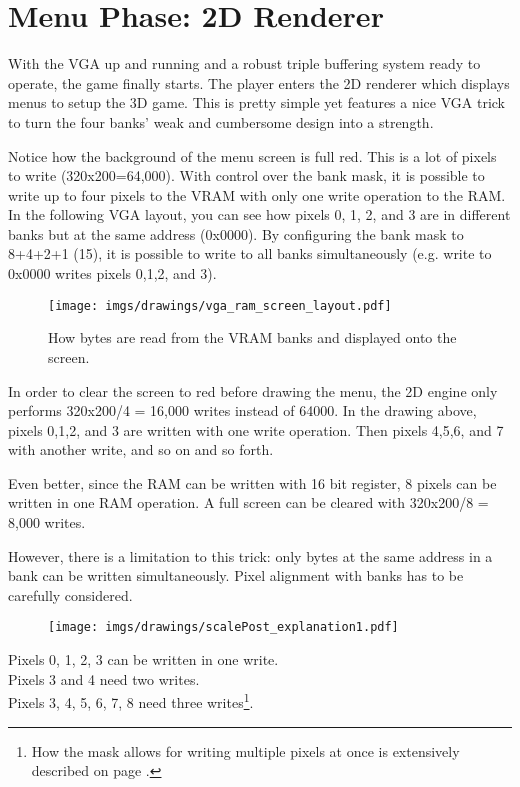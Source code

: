 \section{Menu Phase: 2D Renderer}
With the VGA up and running and a robust triple buffering system ready to operate, the game finally starts. The player enters the 2D renderer which displays menus to setup the 3D game. This is pretty simple yet features a nice VGA trick to turn the four banks' weak and cumbersome design into a strength.
\par
\begin{figure}[H]
\centering
{}
\end{figure}
\par

Notice how the background of the menu screen is full red. This is a lot of pixels to write (320x200=64,000). With control over the bank mask, it is possible to write up to four pixels to the VRAM with only one write operation to the RAM. In the following VGA layout, you can see how pixels 0, 1, 2, and 3 are in different banks but at the same address (0x0000). By configuring the bank mask to 8+4+2+1 (15), it is possible to write to all banks simultaneously (e.g. write to 0x0000 writes pixels 0,1,2, and 3).\\
\par
\begin{figure}[H]
\centering
\texttt{[image: imgs/drawings/vga\_ram\_screen\_layout.pdf]}
\caption{How bytes are read from the VRAM banks and displayed onto the screen.}
\end{figure}

\par
In order to clear the screen to red before drawing the menu, the 2D engine only performs 320x200/4 = 16,000 writes instead of 64000. In the drawing above, pixels 0,1,2, and 3 are written with one write operation. Then pixels 4,5,6, and 7 with another write, and so on and so forth.\\
\par
Even better, since the RAM can be written with 16 bit register, 8 pixels can be written in one RAM operation. A full screen can be cleared with 320x200/8 = 8,000 writes.
\par
\begin{minipage}{\textwidth}

\end{minipage}
However, there is a limitation to this trick: only bytes at the same address in a bank can be written simultaneously. Pixel alignment with banks has to be carefully considered.\
\par
\begin{figure}[H]
\centering
 \texttt{[image: imgs/drawings/scalePost\_explanation1.pdf]}
 
 \end{figure}
Pixels 0, 1, 2, 3 can be written in one write.\\
Pixels 3 and 4 need two writes.\\
Pixels 3, 4, 5, 6, 7, 8 need three writes\footnote{How the mask allows for writing multiple pixels at once is extensively described on page \pageref{simd_vga}.}.\\


